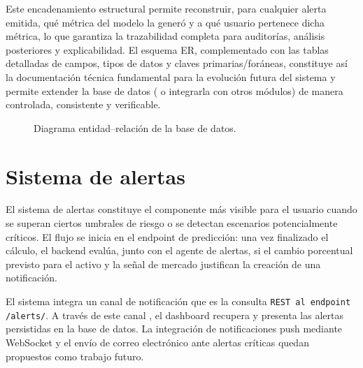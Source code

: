 Este encadenamiento estructural permite reconstruir, para cualquier alerta emitida, qué métrica del modelo la generó y a qué usuario pertenece dicha métrica, lo que garantiza la  trazabilidad completa para auditorías, análisis posteriores y explicabilidad. El esquema ER, complementado con las tablas detalladas de campos, tipos de datos y claves primarias/foráneas, constituye así la documentación técnica fundamental para la evolución futura del sistema y permite extender la base de datos  ( o integrarla con otros módulos) de manera controlada, consistente y verificable.

\begin{figure}[H]
\centering
{}

\caption{Diagrama entidad–relación de la base de datos.}
\label{fig:er-db}
\end{figure}


\section{Sistema de alertas}



El sistema de alertas constituye el componente más visible para el usuario cuando
se superan ciertos umbrales de riesgo o se detectan escenarios potencialmente
críticos. El flujo se inicia en el endpoint de predicción: una vez finalizado el
cálculo, el backend evalúa, junto con el agente de alertas, si el cambio porcentual
previsto para el activo y la señal de mercado justifican la creación de una
notificación.

El sistema integra un canal de notificación que es la consulta   \texttt {REST al endpoint /alerts/}. A través de este canal , el dashboard recupera y presenta las alertas persistidas en la base de datos.
La   integración de notificaciones push mediante WebSocket y el envío de correo electrónico ante  alertas críticas quedan propuestos como trabajo futuro.

